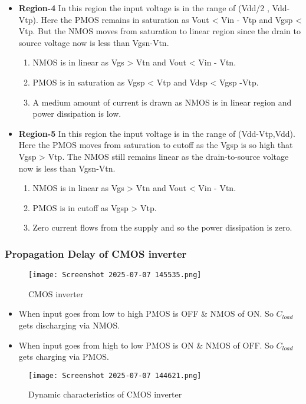 \documentclass[12pt]{article}
\begin{document}
\begin{itemize}
\item \textbf{Region-4}
In this region the input voltage is in the range of (Vdd/2 , Vdd-Vtp). Here the PMOS remains in saturation as Vout < Vin - Vtp and Vgsp < Vtp. But the NMOS moves from saturation to linear region since the drain to source voltage now is less than Vgsn-Vtn.
\begin{enumerate}
    \item NMOS is in linear as Vgs > Vtn and Vout < Vin - Vtn.
\item PMOS is in saturation as Vgsp < Vtp and Vdsp < Vgsp -Vtp.
\item A medium amount of current is drawn as NMOS is in linear region and power dissipation is low.
\end{enumerate}

\item \textbf{Region-5}
In this region the input voltage is in the range of (Vdd-Vtp,Vdd). Here the PMOS moves from saturation to cutoff as the Vgsp is so high that Vgsp > Vtp. The NMOS still remains linear as the drain-to-source voltage now is less than Vgsn-Vtn.
\begin{enumerate}
    \item NMOS is in linear as Vgs > Vtn and Vout < Vin - Vtn.
\item PMOS is in cutoff as Vgsp > Vtp.
\item Zero current flows from the supply and so the power dissipation is zero.

\end{enumerate}
\end{itemize}

\subsubsection{Propagation Delay of CMOS inverter }
    \begin{figure}[H]
        \centering
        \texttt{[image: Screenshot 2025-07-07 145535.png]}
        \caption{CMOS inverter}
        \label{fig:enter-label}
    \end{figure}
    \begin{itemize}
        \item When input goes from low to high PMOS is OFF \& NMOS of ON. So $C_{load}$ gets discharging via NMOS.
        \item When input goes from high to low PMOS is ON \& NMOS of OFF. So $C_{load}$ gets charging via PMOS.
    \end{itemize}
    \begin{figure}[H]
        \centering
        \texttt{[image: Screenshot 2025-07-07 144621.png]}
        \caption{Dynamic characteristics of CMOS inverter}
        \label{fig:enter-label}
    \end{figure}
\end{document}
